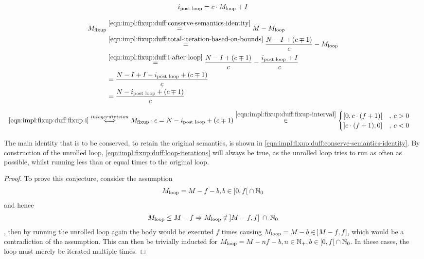 \begin{equation}\label{eqn:impl:fixup:duff:i-after-loop}
\begin{aligned}
    i_\text{post loop} = c \cdot M_{\text{loop}} + I
\end{aligned}
\end{equation}

\begin{equation}\label{eqn:impl:fixup:duff:fixup-i}
\begin{aligned}
    M_{\text{fixup}} & \overset{\ref{eqn:impl:fixup:duff:conserve-semantics-identity}}{=} M - M_{\text{loop}} \\
    & \overset{\ref{eqn:impl:fixup:duff:total-iteration-based-on-bounds}}{=}
    \frac{N - I + (c \mp 1)}{c} - M_{\text{loop}} \\
    & \overset{\ref{eqn:impl:fixup:duff:i-after-loop}}{=}
    \frac{N - I + (c \mp 1)}{c} - \frac{i_\text{post loop} + I}{c} \\
    &= \frac{N - I + I - i_\text{post loop} + (c \mp 1)}{c}\\
    &= \frac{N - i_\text{post loop} + (c \mp 1)}{c}
\end{aligned}
\end{equation}

\begin{equation}\label{eqn:impl:fixup:duff:fixup-i-mult}
\begin{aligned}
    \ref{eqn:impl:fixup:duff:fixup-i} &\overset{integer division}{\Longleftrightarrow} M_{\text{fixup}} \cdot c = N - i_\text{post loop} + (c \mp 1) \overset{\ref{eqn:impl:fixup:duff:fixup-interval}}{\in}  \begin{cases} \lbrack 0, c \cdot (f + 1) \lbrack &, \medspace c > 0\\ \rbrack c \cdot (f + 1), 0 \rbrack &, \medspace c < 0 \end{cases} 
\end{aligned}
\end{equation}

The main identity that is to be conserved, to retain the original semantics, is shown in \cref{eqn:impl:fixup:duff:conserve-semantics-identity}.
By construction of the unrolled loop, \cref{eqn:impl:fixup:duff:loop-iterations} will always be true, as the unrolled loop tries to run as often as possible, whilst running less than or equal times to the original loop.

\begin{proof}\label{proof:impl:fixup:duff:loop-iterations}
To prove this conjecture, consider the assumption
\[M_{\text{loop}} = M - f - b,  b \in \lbrack 0, f \lbrack \medspace \cap \medspace \mathbb{N}_0\]
and hence
\[M_{\text{loop}} \leq M - f \Rightarrow M_{\text{loop}} \notin \medspace \rbrack M-f,f \rbrack \medspace \cap \medspace \mathbb{N}_0 \]
, then by running the unrolled loop again the body would be executed $f$ times causing $M_{\text{loop}} = M - b \in \medspace \rbrack M-f,f \rbrack$, which would be a contradiction of the assumption.
This can then be trivially inducted for $M_{\text{loop}} = M - nf - b, n \in \mathbb{N}_{+}, b \in \lbrack 0, f \lbrack \medspace \cap \medspace \mathbb{N}_0$.
In these cases, the loop must merely be iterated multiple times.
\end{proof}

